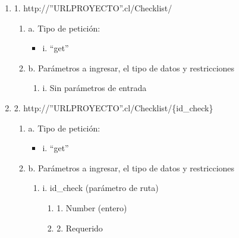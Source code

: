 \begin{enumerate}
    \item 1. http://”URLPROYECTO”.cl/Checklist/
    \begin{enumerate}
        \item a. Tipo de petición:
            \begin{itemize}
               \item i. “get”
            \end{itemize}
        \item b. Parámetros a ingresar, el tipo de datos y restricciones
            \begin{enumerate}
                \item i. Sin parámetros de entrada
            \end{enumerate}
    \end{enumerate}

    \item 2. http://”URLPROYECTO”.cl/Checklist/\{id\_check\}
    \begin{enumerate}
        \item a. Tipo de petición:
            \begin{itemize}
               \item i. “get”
            \end{itemize}
        \item b. Parámetros a ingresar, el tipo de datos y restricciones
            \begin{enumerate}
                \item i. id\_check (parámetro de ruta)
                    \begin{enumerate}
                        \item 1. Number (entero)
                        \item 2. Requerido
                    \end{enumerate}
            \end{enumerate}
    \end{enumerate}


\end{enumerate}
